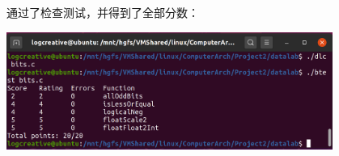 \documentclass[12pt,a4paper]{article}
\newenvironment{problems}{\begin{list}{}{\renewcommand{\makelabel}[1]{\textbf{##1}.\hfil}}}{\end{list}}
\begin{document}
\begin{problems}
    通过了检查测试，并得到了全部分数：

    \includegraphics[width=0.8\textwidth]{score.png}


    \inputminted[breaklines,autogobble,frame=lines,framesep=2mm,fontsize=\scriptsize]{c}{../datalab/bits.c}


\end{problems}
\end{document}
